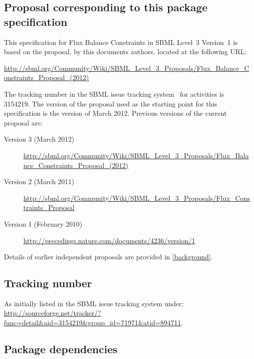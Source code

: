 \subsection{Proposal corresponding to this package specification} 

This specification for Flux Balance Constraints in SBML Level~3 
Version~1 is based on the proposal, by this documents authors, located 
at the following URL: 
\begin{center} 
  \vspace*{1ex}\small 
  \url{http://sbml.org/Community/Wiki/SBML_Level_3_Proposals/Flux_Balance_Constraints_Proposal_(2012)} 
  \vspace*{1ex} 
\end{center} 

The tracking number in the SBML issue tracking system~\citep{tracker} 
for \FBCPackage activities is 3154219. The version of the proposal used 
as the starting point for this specification is the version of March 
2012. Previous versions of the current proposal are: 

\begin{description} 
  \item[Version 3 (March 2012)] 
  \item [] \small{\url{http://sbml.org/Community/Wiki/SBML_Level_3_Proposals/Flux_Balance_Constraints_Proposal_(2012)}} 
  \item[Version 2 (March 2011)] 
  \item [] \small{\url{http://sbml.org/Community/Wiki/SBML_Level_3_Proposals/Flux_Constraints_Proposal}} 
  \item[Version 1 (February 2010)] 
  \item [] \small{\url{http://precedings.nature.com/documents/4236/version/1}} 
\end{description} 

Details of earlier independent proposals are provided 
in \ref{background}. 

\subsection{Tracking number} 
As initially listed in the SBML issue tracking system under:\\ 
\url{http://sourceforge.net/tracker/?func=detail&aid=3154219&group_id=71971&atid=894711}. 

\subsection{Package dependencies} 

